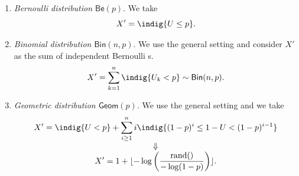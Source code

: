 \documentclass[12pt]{report}
\begin{document}
\begin{enumerate}[\circnum]
	\item \emph{Bernoulli distribution $\mathsf{Be}(p)$}. We take
	\begin{equation*}
		X'=\indig{U\leq p}.
	\end{equation*}
	\item \emph{Binomial distribution $\mathsf{Bin}(n,p)$}. We use the general setting and consider $X'$ as the sum of independent Bernoulli \rv s.
	\begin{equation*}
		X'=\sum_{k=1}^{n}\indig{U_{k}<p}\sim\mathsf{Bin}(n,p).
	\end{equation*}
	\item \emph{Geometric distribution $\mathsf{Geom}(p)$}. We use the general setting and we take
	\begin{equation*}
		\begin{array}{>{\displaystyle}c}
			X'=\indig{U<p}+\sum_{i\geq 1}^{n}i\indig{(1-p)^{i}\leq 1-U<(1-p)^{i-1}}\\
			\Downarrow\\
			X'=1+\lfloor-\log\left(\frac{\mathrm{rand}()}{-\log(1-p)}\right)\rfloor.
		\end{array}
	\end{equation*}
\end{enumerate}
\end{document}
